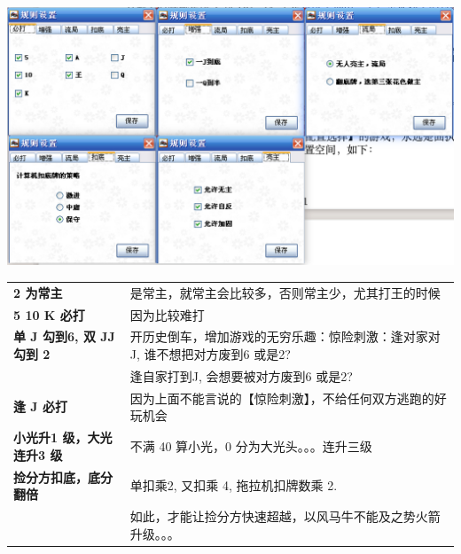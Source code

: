 \documentclass[9pt, b5paper]{article}
\begin{document}
\includegraphics[width=.9\linewidth]{./pic/readme_20230510_160604.png}

\begin{center}
\begin{tabular}{ll}
\textbf{2 为常主} & 是常主，就常主会比较多，否则常主少，尤其打王的时候\\
\textbf{5 10 K 必打} & 因为比较难打\\
\textbf{单 J 勾到6, 双 JJ 勾到 2} & 开历史倒车，增加游戏的无穷乐趣：惊险刺激：逢对家对J, 谁不想把对方废到6 或是2?\\
 & 逢自家打到J, 会想要被对方废到6 或是2?\\
\textbf{逢 J 必打} & 因为上面不能言说的【惊险刺激】，不给任何双方逃跑的好玩机会\\
\textbf{小光升1 级，大光连升3 级} & 不满 40 算小光，0 分为大光头。。。连升三级\\
\textbf{捡分方扣底，底分翻倍} & 单扣乘2, 又扣乘 4, 拖拉机扣牌数乘 2.\\
 & 如此，才能让捡分方快速超越，以风马牛不能及之势火箭升级。。。\\
\end{tabular}
\end{center}
\end{document}
